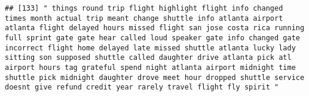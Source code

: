 \documentclass[
]{article}
\begin{document}
\begin{verbatim}
## [133] " things round trip flight highlight flight info changed times month actual trip meant change shuttle info atlanta airport atlanta flight delayed hours missed flight san jose costa rica running full sprint gate gate hear called loud speaker gate info changed gate incorrect flight home delayed late missed shuttle atlanta lucky lady sitting son supposed shuttle called daughter drive atlanta pick atl airport hours tag grateful spend night atlanta airport midnight time shuttle pick midnight daughter drove meet hour dropped shuttle service doesnt give refund credit year rarely travel flight fly spirit "                                                                                                                                                                                                                                                                                                                                                                                                                                                                                                                                                                                                                                                                                                                                                                                                                                                                                                                                                                                                                                                                                                                                                                   

\end{verbatim}
\end{document}
